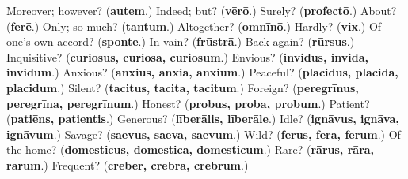 \begin{tcolorbox}[breakable,colback=teal!4,colframe=teal!35!black,title={Before you move on}]
Moreover; however? (\textbf{autem}.) Indeed; but? (\textbf{vērō}.) Surely? (\textbf{profectō}.) About? (\textbf{ferē}.) Only; so much? (\textbf{tantum}.) Altogether? (\textbf{omnīnō}.) Hardly? (\textbf{vix}.) Of one's own accord? (\textbf{sponte}.) In vain? (\textbf{frūstrā}.) Back again? (\textbf{rūrsus}.) Inquisitive? (\textbf{cūriōsus, cūriōsa, cūriōsum}.) Envious? (\textbf{invidus, invida, invidum}.) Anxious? (\textbf{anxius, anxia, anxium}.) Peaceful? (\textbf{placidus, placida, placidum}.) Silent? (\textbf{tacitus, tacita, tacitum}.) Foreign? (\textbf{peregrīnus, peregrīna, peregrīnum}.) Honest? (\textbf{probus, proba, probum}.) Patient? (\textbf{patiēns, patientis}.) Generous? (\textbf{līberālis, līberāle}.) Idle? (\textbf{ignāvus, ignāva, ignāvum}.) Savage? (\textbf{saevus, saeva, saevum}.) Wild? (\textbf{ferus, fera, ferum}.) Of the home? (\textbf{domesticus, domestica, domesticum}.) Rare? (\textbf{rārus, rāra, rārum}.) Frequent? (\textbf{crēber, crēbra, crēbrum}.)
\end{tcolorbox}
